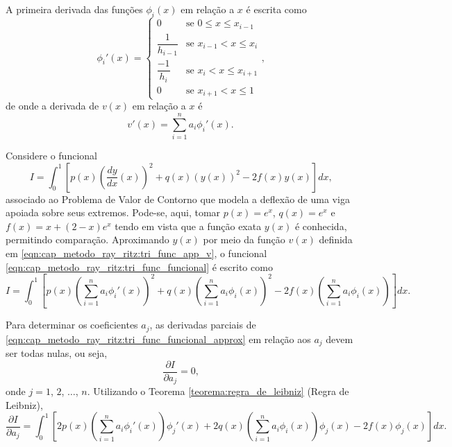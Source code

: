 \documentclass[
	12pt,				%
	openright,			%
    twoside,			%
	a4paper,			%
	english,			%
	french,				%
	spanish,			%
	brazil				%
	]{abntex2}
\numberwithin{lema}{chapter}
\numberwithin{teorema}{chapter}
\numberwithin{definicao}{chapter}
\numberwithin{exemplo}{chapter}
\numberwithin{figure}{chapter}
\begin{document}
A primeira derivada das funções $\phi_i(x)$ em relação a $x$ é escrita como
\begin{equation}
	\label{eqn:cap_metodo_ray_ritz:tri_func_phi_diff}
	\phi_i ' (x) = 
		\begin{cases}
			0 							& \mbox{se } 0 \leqslant x \leqslant x_{i - 1}\\
			\dfrac{1}{h_{i-1}} 			& \mbox{se } x_{i-1} < x \leqslant x_i\\
			\dfrac{-1}{h_i}				& \mbox{se } x_i < x \leqslant x_{i+1}\\
			0							& \mbox{se } x_{i+1}<x\leqslant 1
		\end{cases}
	\text{,}
\end{equation}
de onde a derivada de $v(x)$ em relação a $x$ é
\begin{equation}
	v'(x)=\sum_{i=1}^{n} a_i \phi_i '(x)
	\text{.}
\end{equation}

Considere o funcional
\begin{equation}
	\label{eqn:cap_metodo_ray_ritz:tri_func_funcional}
	I = \int_{0}^{1} \left [ 
		p(x) \left ( 
			\frac{dy}{dx} (x) 
		\right )^2
		+ q(x)(y(x))^2 
		- 2f(x)y(x) 
	\right ] dx
	\text{,}
\end{equation}
associado ao Problema de Valor de Contorno que modela a deflexão de uma viga apoiada sobre seus extremos. Pode-se, aqui, tomar $p(x)=e^x$, $q(x)=e^x$ e $f(x)=x+(2-x)e^x$ tendo em vista que a função exata $y(x)$ é conhecida, permitindo comparação. Aproximando $y(x)$ por meio da função $v(x)$ definida em \eqref{eqn:cap_metodo_ray_ritz:tri_func_app_v}, o funcional \eqref{eqn:cap_metodo_ray_ritz:tri_func_funcional} é escrito como
\begin{equation}
	\label{eqn:cap_metodo_ray_ritz:tri_func_funcional_approx}
	I = \int_{0}^{1} \left [
		p(x) \left (
			\sum_{i=1}^{n} a_i \phi_i '(x)
		\right )^2
		+ q(x) \left (
			\sum_{i=1}^{n} a_i \phi_i (x)
		\right )^2
		- 2f(x) \left (
			\sum_{i=1}^{n} a_i \phi_i (x)
		\right )
	\right ] dx
	\text{.}
\end{equation}

Para determinar os coeficientes $a_j$, as derivadas parciais de \eqref{eqn:cap_metodo_ray_ritz:tri_func_funcional_approx} em relação aos $a_j$ devem ser todas nulas, ou seja,
$$
	\frac{\partial I}{\partial a_j} = 0
	\text{,}
$$
onde $j=1$, $2$, $\dots$, $n$. Utilizando o Teorema \ref{teorema:regra_de_leibniz} (Regra de Leibniz),
\begin{equation}
	\label{eqn:cap_metodo_ray_ritz:tri_func_funcional_derivada}
	\frac{\partial I}{\partial a_j} = 
	\int_{0}^{1} \left [
		2p(x) \left (
			\sum_{i=1}^{n} a_i \phi_i'(x)
		\right ) \phi_j'(x)
		+ 2q(x) \left (
			\sum_{i=1}^{n} a_i \phi_i(x)
		\right ) \phi_j(x)
		- 2f(x)\phi_j(x)
	\right ] dx
	\text{.}
\end{equation}
\end{document}
